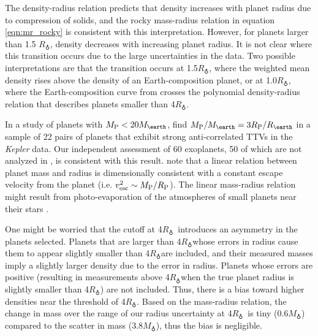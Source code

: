 \documentclass[iop]{emulateapj}
\newcommand{\rpl}{\ensuremath{R_{\rm P}}}
\newcommand{\mpl}{\ensuremath{M_{\rm P}}}
\newcommand{\rearth}{\ensuremath{R_\earth}}
\newcommand{\mearth}{\ensuremath{M_\earth}}
\begin{document}
The \citet{Seager2007} density-radius relation predicts that density increases with planet radius due to compression of solids, and the rocky mass-radius relation in equation \ref{eqn:mr_rocky} is consistent with this interpretation.  However, for planets larger than 1.5 \rearth, density decreases with increasing planet radius.  It is not clear where this transition occurs due to the large uncertainties in the data.  Two possible interpretations are that the transition occurs at 1.5\rearth, where the weighted mean density rises above the density of an Earth-composition planet, or at 1.0\rearth, where the Earth-composition curve from \citet{Seager2007} crosses the polynomial density-radius relation that describes planets smaller than 4\rearth.

In a study of planets with $\mpl < 20\mearth$, \citet{WL2013} find $\mpl/\mearth = 3 \rpl/\rearth$ in a sample of 22 pairs of planets that exhibit strong anti-correlated TTVs in the \textit{Kepler} data.  Our independent assessment of 60 exoplanets, 50 of which are not analyzed in \citet{WL2013}, is consistent with this result.  \citet{WL2013} note that a linear relation between planet mass and radius is dimensionally consistent with a constant escape velocity from the planet (i.e. $v_{\mathrm{esc}}^2 \sim \mpl/\rpl$).  The linear mass-radius relation might result from photo-evaporation of the atmospheres of small planets near their stars \citep{Lopez2012}.

One might be worried that the cutoff at 4\rearth\ introduces an asymmetry in the planets selected.  Planets that are larger than 4\rearth whose errors in radius cause them to appear slightly smaller than 4\rearth are included, and their measured masses imply a slightly larger density due to the error in radius.  Planets whose errors are positive (resulting in measurements above 4\rearth when the true planet radius is slightly smaller than 4\rearth) are not included.  Thus, there is a bias toward higher densities near the threshold of 4\rearth.  Based on the mass-radius relation, the change in mass over the range of our radius uncertainty at 4\rearth\ is tiny (0.6\mearth) compared to the scatter in mass (3.8\mearth), thus the bias is negligible.
\end{document}
